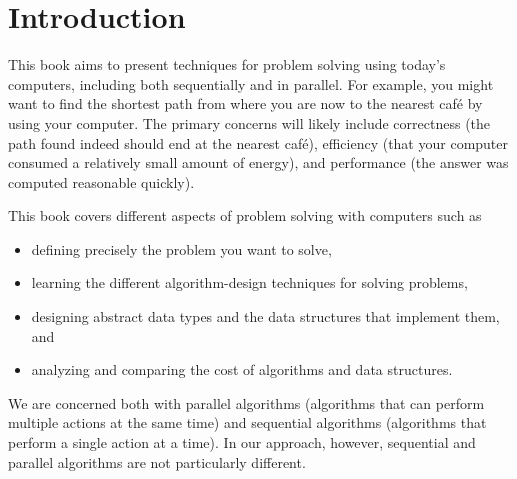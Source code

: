 \chapter{Introduction}
\label{ch:introduction::intro}

\begin{cluster}
\label{grp:grm:introduction::intro::book}

\begin{gram}
\label{grm:introduction::intro::book}
This book aims to present techniques for problem solving using today's computers, including both sequentially and in parallel.
For example, you might want to find the shortest path from where you are now to the nearest caf\'e by using your computer.
The primary concerns will likely include correctness (the path found indeed should end at the nearest caf\'e), 
efficiency (that your computer consumed a relatively small amount of energy), and performance (the answer was computed reasonable quickly).

This book covers different aspects of problem solving with computers such as 
\begin{itemize}
\item defining precisely the problem you want to solve,
\item learning the different algorithm-design techniques for solving problems,
\item designing abstract data types and the data structures that
  implement them, and
\item analyzing and comparing the cost of algorithms and data structures.
\end{itemize}

\end{gram}
\end{cluster}

\begin{cluster}
\label{grp:rmrk:introduction::intro::concerned}

\begin{remark}
\label{rmrk:introduction::intro::concerned}
We are concerned both with 
parallel algorithms (algorithms that can perform multiple actions at the same time)
and 
sequential algorithms (algorithms that perform a single action at a time).
In our approach, however, sequential and parallel algorithms are not particularly different.

\end{remark}
\end{cluster}

